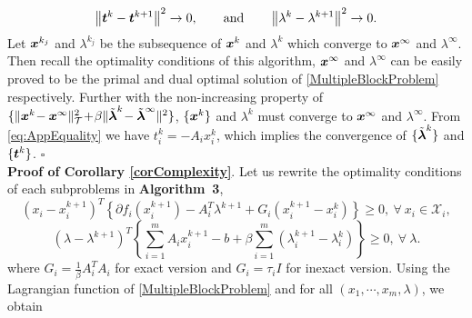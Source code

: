 \documentclass{mcom-l}
\theoremstyle{definition}
\theoremstyle{remark}
\numberwithin{equation}{section}
\begin{document}
$$
\left\| {{\mbox{\boldmath $t$}}}^k - {{\mbox{\boldmath $t$}}}^{k+1} \right\|^2 \rightarrow 0,\qquad\hbox{and}\qquad \left\| \lambda^k - \lambda^{k+1} \right\|^2 \rightarrow 0.
$$
Let ${{\mbox{\boldmath $x$}}}^{k_j}$ and $\lambda^{k_j}$ be the subsequence of ${{\mbox{\boldmath $x$}}}^k$ and $\lambda^k$ which converge to ${{\mbox{\boldmath $x$}}}^{\infty}$ and $\lambda^{\infty}$. Then recall the optimality conditions of this algorithm, ${{\mbox{\boldmath $x$}}}^{\infty}$ and $\lambda^{\infty}$ can be easily proved to be the primal and dual optimal solution of \eqref{MultipleBlockProblem} respectively. Further with the non-increasing property of $\{\|{{\mbox{\boldmath $x$}}}^k \!- {{\mbox{\boldmath $x$}}}^{\infty}\|_{\mathcal{T}}^2 \!+\! \beta \| \tilde{{\mbox{\boldmath $\lambda$}}}^k \!- \tilde{{\mbox{\boldmath $\lambda$}}}^{\infty} \|^2\}$, $\{{{\mbox{\boldmath $x$}}}^k\}$ and $\lambda^k$ must converge to ${{\mbox{\boldmath $x$}}}^{\infty}$ and $\lambda^{\infty}$. From \eqref{eq:AppEquality} we have $t_i^k = - A_i x_i^k$, which implies the convergence of $\{\tilde{{\mbox{\boldmath $\lambda$}}}^k\}$ and $\{{{\mbox{\boldmath $t$}}}^k\}$. \hfill$\square$
\bigskip\\
{\bf{Proof of Corollary \ref{corComplexity}}}. Let us rewrite the optimality conditions of each subproblems in {\bf{Algorithm~3}},
$$
\left(x_i - x_i^{k+1}\right)^T \left\{ \partial f_i (x_i^{k+1}) - A_i^T \lambda^{k+1} + G_i \left( x_i^{k+1} - x_i^k \right) \right\}\ge 0,\ \forall\ x_i\in {\mathcal{X}}_i,
$$
$$
\left( \lambda - \lambda^{k+1} \right)^T \left\{ \sum\limits_{i=1}^m A_i x_i^{k+1} - b + \beta \sum\limits_{i=1}^m \left( \lambda_i^{k+1} - \lambda_i^k \right) \right\}\ge 0,\ \forall\  \lambda.
$$
where $G_i = \frac{1}{\beta} A_i^T A_i$ for exact version and $G_i = \tau_i I$ for inexact version. Using the Lagrangian function of \eqref{MultipleBlockProblem} and for all $(x_1,\cdots,x_m,\lambda)$, we obtain
\end{document}

